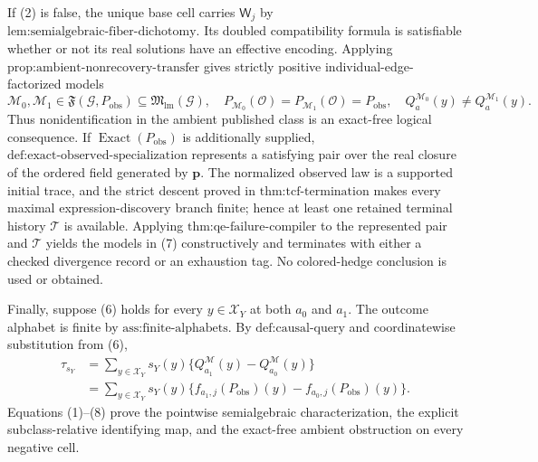 If (2) is false, the unique base cell carries \(\mathsf W_j\) by \(\text{lem:semialgebraic-fiber-dichotomy}\). Its doubled compatibility formula is satisfiable whether or not its real solutions have an effective encoding. Applying \(\text{prop:ambient-nonrecovery-transfer}\) gives strictly positive individual-edge-factorized models
\[
\mathcal M_0,\mathcal M_1\in\mathfrak F(\mathcal G,P_{\mathrm{obs}})
\subseteq\mathfrak M_{\mathrm{lm}}(\mathcal G),
\quad
P_{\mathcal M_0}(\mathcal O)=P_{\mathcal M_1}(\mathcal O)=P_{\mathrm{obs}},
\quad
Q_a^{\mathcal M_0}(y)\neq Q_a^{\mathcal M_1}(y).
\tag{7}
\]
Thus nonidentification in the ambient published class is an exact-free logical consequence. If \(\operatorname{Exact}(P_{\mathrm{obs}})\) is additionally supplied, \(\text{def:exact-observed-specialization}\) represents a satisfying pair over the real closure of the ordered field generated by \(\mathbf p\). The normalized observed law is a supported initial trace, and the strict descent proved in \(\text{thm:tcf-termination}\) makes every maximal expression-discovery branch finite; hence at least one retained terminal history \(\mathcal T\) is available. Applying \(\text{thm:qe-failure-compiler}\) to the represented pair and \(\mathcal T\) yields the models in (7) constructively and terminates with either a checked divergence record or an exhaustion tag. No colored-hedge conclusion is used or obtained.

Finally, suppose (6) holds for every \(y\in\mathcal X_Y\) at both \(a_0\) and \(a_1\). The outcome alphabet is finite by \(\text{ass:finite-alphabets}\). By \(\text{def:causal-query}\) and coordinatewise substitution from (6),
\[
\begin{aligned}
\tau_{s_Y}
&=\sum_{y\in\mathcal X_Y}s_Y(y)
\{Q_{a_1}^{\mathcal M}(y)-Q_{a_0}^{\mathcal M}(y)\}\\
&=\sum_{y\in\mathcal X_Y}s_Y(y)
\{f_{a_1,j}(P_{\mathrm{obs}})(y)-f_{a_0,j}(P_{\mathrm{obs}})(y)\}.
\end{aligned}
\tag{8}
\]
Equations (1)--(8) prove the pointwise semialgebraic characterization, the explicit subclass-relative identifying map, and the exact-free ambient obstruction on every negative cell.